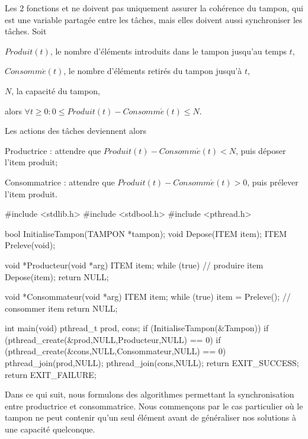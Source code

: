 Les 2 fonctions  et  ne doivent pas uniquement assurer la cohérence du tampon, qui est une variable partagée entre les tâches, mais elles doivent aussi synchroniser les tâches. Soit

\hspace{0.6cm}$Produit(t)$, le nombre d'éléments introduits dans le tampon jusqu'au temps $t$,

\hspace{0.6cm}$Consomm\acute{e}(t)$, le nombre d'éléments retirés du tampon jusqu'à $t$,

\hspace{0.6cm}$N$, la capacité du tampon,

alors $\forall t \geq 0: 0 \leq Produit(t) - Consomm\acute{e}(t) \leq N$.

Les actions des tâches deviennent alors

\hspace{0.6cm}Productrice : attendre que $Produit(t) - Consomm\acute{e}(t) < N$, puis déposer l'item produit;

\hspace{0.6cm}Consommatrice : attendre que $Produit(t) - Consomm\acute{e}(t) > 0$, puis prélever l'item produit.

\begin{codeblock}[title=Schéma des tâches productrices et consommatrices,label=prodcons:base]
#include <stdlib.h>
#include <stdbool.h>
#include <pthread.h>

bool InitialiseTampon(TAMPON *tampon);
void Depose(ITEM item);
ITEM Preleve(void);

void *Producteur(void *arg)
{
  ITEM item;
  while (true) {
     // produire item
     Depose(item);
  }
  return NULL;
}

void *Consommateur(void *arg)
{
  ITEM item;
  while (true) {
     item = Preleve();
     // consommer item
  }
  return NULL;
}

int main(void)
{
  pthread_t prod, cons;
  if (InitialiseTampon(&Tampon))
     if (pthread_create(&prod,NULL,Producteur,NULL) == 0)
        if (pthread_create(&cons,NULL,Consommateur,NULL) == 0) {
           pthread_join(prod,NULL);
           pthread_join(cons,NULL);
           return EXIT_SUCCESS;
        }
  return EXIT_FAILURE;
}
\end{codeblock}

Dans ce qui suit, nous formulons des algorithmes permettant la synchronisation entre productrice et consommatrice. Nous commençons par le cas particulier où le tampon ne peut contenir qu'un seul élément avant de généraliser nos solutions à une capacité quelconque.

